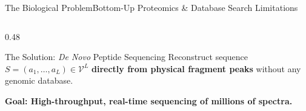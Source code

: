\documentclass[aspectratio=169, 10pt]{beamer}
\begin{document}
\begin{frame}{The Biological Problem}{Bottom-Up Proteomics \& Database Search Limitations}
\begin{columns}[T]
\begin{column}{0.48\textwidth}
  \begin{exampleblock}{\scriptsize The Solution: \emph{De Novo} Peptide Sequencing}
    Reconstruct sequence $S = (a_1, \dots, a_L) \in \mathcal{V}^L$ \textbf{directly from physical fragment peaks} without any genomic database.
  \end{exampleblock}
  \vspace{0.1cm}
  \vspace{0.1cm}
  \begin{center}
    {\scriptsize\color{CoralRed}\textbf{Goal: High-throughput, real-time sequencing of millions of spectra.}}
  \end{center}
\end{column}
\end{columns}
\end{frame}
\end{document}
